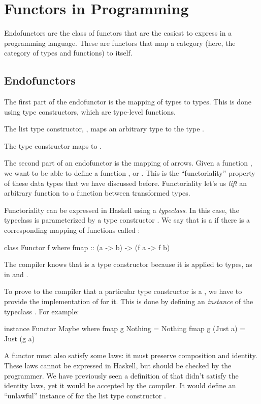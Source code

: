 \documentclass[DaoFP]{subfiles}
\begin{document}
\section{Functors in Programming}

Endofunctors are the class of functors that are the easiest to express in a programming language. These are functors that map a category (here, the category of types and functions) to itself. 

\subsection{Endofunctors}
The first part of the endofunctor is the mapping of types to types. This is done using type constructors, which are type-level functions. 

The list type constructor, , maps an arbitrary type  to the type .

The  type constructor maps  to .

The second part of an endofunctor is the mapping of arrows. Given a function , we want to be able to define a function , or . This is the ``functoriality'' property of these data types that we have discussed before. Functoriality let's us \emph{lift} an arbitrary function to a function between transformed types.

Functoriality can be expressed in Haskell using a \emph{typeclass}. In this case, the typeclass is parameterized by a type constructor . We say that  is a  if there is a corresponding mapping of functions called :
\begin{haskell}
class Functor f where
  fmap :: (a -> b) -> (f a -> f b)
\end{haskell}
The compiler knows that  is a type constructor because it is applied to types, as in  and .

To prove to the compiler that a particular type constructor is a , we have to provide the implementation of  for it. This is done by defining an \emph{instance} of the typeclass . For example:
\begin{haskell}
instance Functor Maybe where
  fmap g Nothing  = Nothing
  fmap g (Just a) = Just (g a)
\end{haskell}

A functor must also satisfy some laws: it must preserve composition and identity. These laws cannot be expressed in Haskell, but should be checked by the programmer. We have previously seen a definition of  that didn't satisfy the identity laws, yet it would be accepted by the compiler. It would define an ``unlawful'' instance of  for the list type constructor \hask{[]}.
\end{document}
